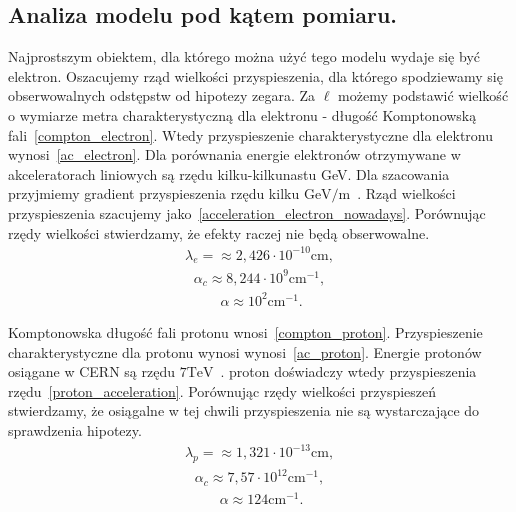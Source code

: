 \subsection{Analiza modelu pod kątem pomiaru.}
Najprostszym obiektem, dla którego można użyć tego modelu wydaje się
być elektron. 
Oszacujemy rząd wielkości przyspieszenia, dla którego spodziewamy się 
obserwowalnych odstępstw od hipotezy zegara.
Za $\ell$ możemy podstawić wielkość o wymiarze metra 
charakterystyczną dla elektronu - długość 
Komptonowską fali~\eqref{compton_electron}. 
Wtedy przyspieszenie charakterystyczne dla elektronu 
wynosi~\eqref{ac_electron}.
Dla porównania energie elektronów otrzymywane 
w akceleratorach liniowych są rzędu kilku-kilkunastu GeV.
Dla szacowania przyjmiemy gradient przyspieszenia rzędu
kilku $ \si{\giga\electronvolt \per \metre}$~\cite{Ghotra2015}.
Rząd wielkości przyspieszenia 
szacujemy jako~\eqref{acceleration_electron_nowadays}.
Porównując rzędy wielkości stwierdzamy, że efekty 
raczej nie będą obserwowalne.
\begin{align}\label{compton_electron}
\lambda_e = \approx 2,426 \cdot 10^{-10} \si{\centi\metre} ,
\end{align}
\begin{align}\label{ac_electron}
\alpha_c \approx 8,244\cdot 10^{9} \si{ \centi\metre^{-1}} ,
\end{align}
\begin{align}~\label{acceleration_electron_nowadays}
\alpha \approx 10^2 \si{\centi\metre^{-1}} .
\end{align}

Komptonowska długość fali protonu wnosi~\eqref{compton_proton}. 
Przyspieszenie charakterystyczne dla protonu wynosi
wynosi~\eqref{ac_proton}.
Energie protonów osiągane w CERN są rzędu 
$7 \si{\tera\electronvolt}$~\cite{CERN}. 
proton doświadczy wtedy przyspieszenia
rzędu~\eqref{proton_acceleration}.
Porównując rzędy wielkości przyspieszeń stwierdzamy, 
że osiągalne w tej chwili przyspieszenia nie są wystarczające 
do sprawdzenia hipotezy.
\begin{align}\label{compton_proton}
\lambda_p = \approx 1,321 \cdot 10^{-13} \si{\centi\metre} ,
\end{align}
\begin{align}\label{ac_proton}
\alpha_c \approx 7,57 \cdot 10^{12} \si{ \centi\metre^{-1}} ,
\end{align}
\begin{align}~\label{proton_acceleration}
\alpha \approx 124  \si{\centi\metre^{-1}} .
\end{align}
